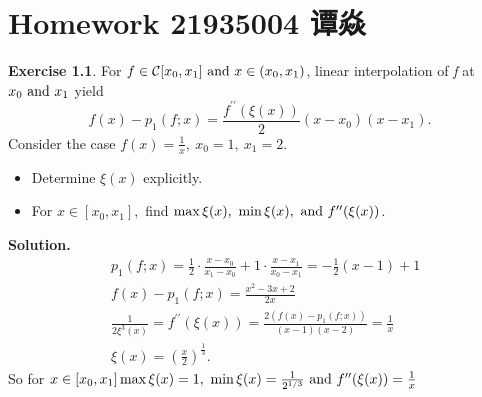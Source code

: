 \documentclass[a4paper]{book}
\makeatletter
\newenvironment{solution}%
{\noindent\textbf{Solution.}}%
{\qedhere}
\newcommand{\voidenvironment}[1]{%
  \expandafter\providecommand\csname env@#1@save@env\endcsname{}%
  \expandafter\providecommand\csname env@#1@process\endcsname{}%
  \@ifundefined{#1}{}{\RenewEnviron{#1}{}}%
}
\numberwithin{equation}{chapter}
\theoremstyle{definition}
\newtheorem{exc}[exm]{Exercise}
\makeatother
\begin{document}
\pagestyle{empty}
% 



\setcounter{chapter}{1}




\chapter{Homework 21935004 谭焱}



\begin{exc}
  For $ f \in \mathcal{C}[x_0, x_1] \textmd{ and } x \in (x_0, x_1)$, linear interpolation of \textit{f} at $x_0 \textmd{ and } x_1$ yield
  \begin{equation}
    \label{eq:2:1:1}
    f(x) - p_1(f;x) = \frac{f^{\prime \prime}(\xi(x))}{2}(x - x_0)(x - x_1).
  \end{equation}
  Consider the case $f(x) = \frac{1}{x},\ x_0 = 1, \ x_1 = 2. $
  \begin{itemize}
  \item Determine $\xi(x)$ explicitly.
  \item For $x \in [x_0, x_1], $ find $\max \xi(x),\ \min \xi(x), \textmd{ and } f^{\prime \prime}(\xi(x))$. 
  \end{itemize}
\end{exc}

\begin{solution}
  \begin{align*}
    &p_1(f;x) = \frac{1}{2} \cdot \frac{x - x_0}{ x_1 - x_0} + 1 \cdot \frac{x - x_1}{x_0 - x_1} = -\frac{1}{2}(x - 1) + 1 \\
    &f(x) - p_1(f;x) = \frac{x^2 - 3x + 2}{2x} \\
    &\frac{1}{2\xi^3(x)} = f^{\prime \prime}(\xi(x)) = \frac{2(f(x) - p_1(f;x))}{(x-1)(x-2)} = \frac{1}{x} \\
    &\xi(x) = (\frac{x}{2})^{\frac{1}{3}}.
  \end{align*}
  So for $x \in [x_0, x_1] \max\xi(x) = 1,\ \min \xi(x) = \frac{1}{2^{1/3}}\textmd{ and } f^{\prime \prime}(\xi(x)) = \frac{1}{x}$
\end{solution}
\end{document}
